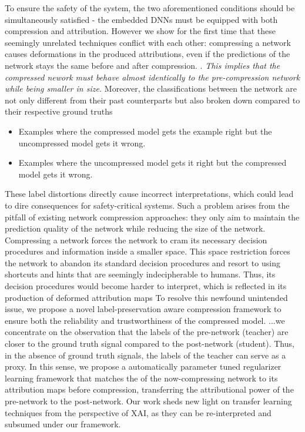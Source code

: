 To ensure the safety of the system, 
the two aforementioned conditions should be simultaneously 
satisfied - the embedded DNNs must be equipped with 
both compression and attribution.
%
%
However we show for the first time that these seemingly
unrelated techniques conflict with each other:
compressing a network causes deformations in 
the produced attributions, even if the predictions 
of the network stays the same before and after compression.
%
%
.
%
%
\textit{This implies that the compressed nework must behave 
almost identically to the pre-compression network while being
smaller in size.}
%
%
Moreover, the classifications between the network are
not only different from their past counterparts 
but also broken down compared to their respective ground truths
%
%
\begin{itemize}
    \item Examples where the compressed model gets the example 
          right but the uncompressed model gets it wrong.
    \item Examples where the uncompressed model gets it right 
          but the compressed model gets it wrong.
\end{itemize}
%
%
These label distortions directly
cause incorrect interpretations, which could lead to dire 
consequences for safety-critical systems.
%
%
Such a problem arises from the pitfall of existing 
network compression approaches: they only
aim to maintain the prediction quality of the network while 
reducing the size of the network.
%
%
Compressing a network forces the network to cram its 
necessary decision procedures and information inside a
smaller space.
%
This space restriction forces the network to abandon its 
standard decision procedures and resort to using shortcuts 
and hints that are seemingly indecipherable to humans.
%
Thus, its decision procedures would become harder to 
interpret, which is reflected in its production of deformed
attribution maps
%
%
To resolve this newfound unintended
issue, we propose a novel label-preservation aware 
compression framework  to ensure both the reliability and 
trustworthiness of the compressed model.
%
...we concentrate on the observation that the labels 
of the pre-network (teacher) are closer to the ground truth signal 
compared to the post-network (student).
%
Thus, in the absence of ground truth signals, the labels
of the teacher can serve as a proxy. 
%
In this sense, we propose a automatically parameter 
tuned regularizer learning framework that matches the 
of the now-compressing network to its attribution maps 
before compression, transferring the attributional power 
of the pre-network to the post-network. Our work sheds 
new light on transfer learning techniques from the perspective of XAI,
as they can be re-interpreted and subsumed under our framework.

